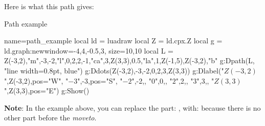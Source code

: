 Here is what this path gives:
\begin{demo}{Path example}
\begin{luadraw}{name=path_example}
local ld = luadraw
local Z = ld.cpx.Z
local g = ld.graph:new{window={-4,4,-0.5,3}, size={10,10}}
local L = { Z(-3,2),"m",-3,-2,"l",0,2,2,-1,"ca",3,Z(3,3),0.5,"la",1,Z(-1,5),Z(-3,2),"b" }
g:Dpath(L, "line width=0.8pt, blue")
g:Ddots({Z(-3,2),-3,-2,0,2,3,Z(3,3)})
g:Dlabel("$Z(-3,2)$",Z(-3,2),{pos="W"}, "$-3$",-3,{pos="S"}, "$-2$",-2,{},
"$0$",0,{}, "$2$",2,{}, "$3$",3,{}, "$Z(3,3)$",Z(3,3),{pos="E"})
g:Show()
\end{luadraw}
\end{demo}

\noindent\textbf{Note}: In the example above, you can replace the part: , with:  because there is no other part before the \emph{moveto}.


